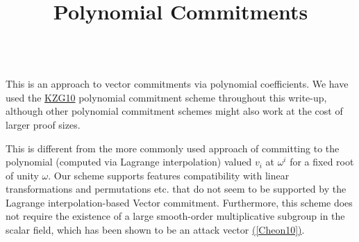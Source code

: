 \documentclass[11pt, lettersize, notitlepage, leqno, footskip=0.6cm]{article}
\newcommand{\vs}{\vspace{-0.15cm}}
\numberwithin{equation}{section}
\begin{document}
 
\title{Polynomial Commitments}
\author{$\;\;\;$}
\affil{}
\date{\vspace{-10ex}}
 
\maketitle


\begin{comment}This is some work that arose from attempts to hide the complexity of a transaction while simultaneously proving in zero-knowledge that the fees were computed fairly/correctly. The reason we were thinking about this is some papers have claimed that the more complex transactions (i.e. more complex that 1 input/2 outputs) on ZCash etc. are more vulnerable to being traced. We have abandoned/postponed this line of thought for now, but might come back to it in the future. \end{comment}

\begin{comment} The proposed scheme had commitments to the fees - rather than the actual fees - revealed on the ledger. The transaction complexity is obfuscated using dummy input/output commitments. The sender of the anonymous transfer would need to prove - in zero-knowledge - that the fees are proportionate to the actual complexity of the transaction rather than the apparent complexity.  \end{comment}


This is an approach to vector commitments via polynomial coefficients. We have used the \hyperlink{KZG}{\hyperlink{KZG}{KZG10}} polynomial commitment scheme throughout this write-up, although other polynomial commitment schemes might also work at the cost of larger proof sizes.


This is different from the more commonly used approach of committing to the polynomial (computed via Lagrange interpolation) valued $v_i$ at $\omega^i$ for a fixed root of unity $\omega$. Our scheme supports features compatibility with linear transformations and permutations etc. that do not seem to be supported by the Lagrange interpolation-based Vector commitment. Furthermore, this scheme does not require the existence of a large smooth-order multiplicative subgroup in the scalar field, which has been shown to be an attack vector \hyperlink{Cheon}{([Cheon10])}. 
\end{document}
